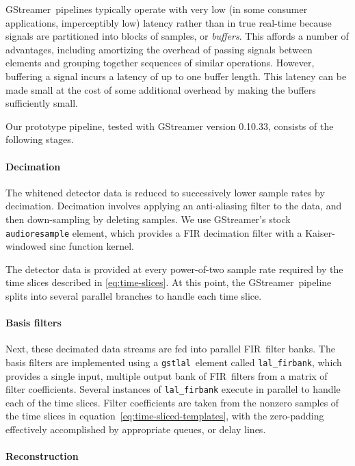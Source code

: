 \documentclass[preprint2]{aastex}
\newcommand{\fir}{FIR}%
\newcommand{\gstlal}{{\tt gstlal}}
\newcommand{\gstreamer}{GStreamer}
\begin{document}
\gstreamer\ pipelines typically operate with very low (in some consumer
applications, imperceptibly low) latency rather than in true real-time because
signals are partitioned into blocks of samples, or \emph{buffers}.  This affords
a number of advantages, including amortizing the overhead of passing signals
between elements and grouping together sequences of similar operations.
However, buffering a signal incurs a latency of up to one buffer length.  This
latency can be made small at the cost of some additional overhead by making the
buffers sufficiently small.

Our prototype pipeline, tested with GStreamer version 0.10.33, consists of the
following stages.

\paragraph{Decimation}

The whitened detector data is reduced to successively lower sample rates by
decimation. Decimation involves applying an anti-aliasing filter to the data,
and then down-sampling by deleting samples.  We use GStreamer's stock
\texttt{audioresample} element, which provides a FIR decimation filter with
a Kaiser-windowed sinc function kernel.

The detector data is provided at every power-of-two sample rate
required by the time slices described in \eqref{eq:time-slices}.  At this point,
the \gstreamer\ pipeline splits into several parallel branches to handle each
time slice.

\paragraph{Basis filters}

Next, these decimated data streams are fed into parallel \fir\ filter banks.
The basis filters are implemented using a \gstlal\ element called
\texttt{lal\_firbank}, which provides a single input, multiple output bank of
\fir\ filters from a matrix of filter coefficients.  Several instances of
\texttt{lal\_firbank} execute in parallel to handle each of the time slices.
Filter coefficients are taken from the nonzero samples of the time slices in
equation~\eqref{eq:time-sliced-templates}, with the zero-padding effectively
accomplished by appropriate queues, or delay lines.

\paragraph{Reconstruction}
\end{document}
